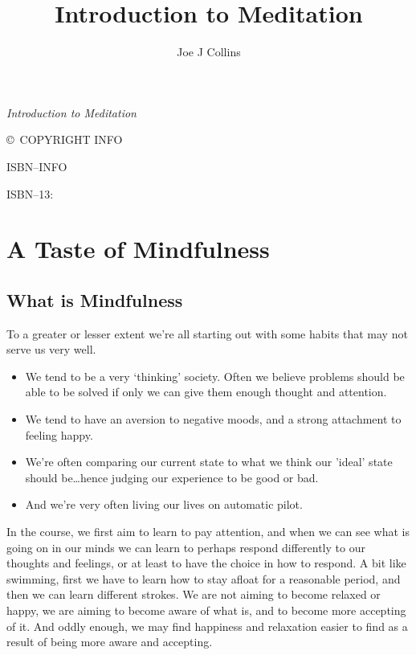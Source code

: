 \documentclass[10pt, twoside, openright, a5paper]{memoir}
\author{Joe J Collins}
\title{Introduction to Meditation}
\date{}
\makeatletter
\def\maketitle{%
  \null
  \thispagestyle{empty}%
  \vfill
  \begin{center}\leavevmode
    \normalfont
    {\LARGE\raggedleft \@author\par}%
    \hrulefill\par
    {\huge\raggedright \@title\par}%
    \vskip 1cm
  \end{center}%
  \vfill
  \null
  \cleardoublepage
  }
\makeatother
\begin{document}
\let\cleardoublepage\clearpage


\maketitle


\frontmatter

\null\vfill

\begin{flushleft}
\textit{Introduction to Meditation}

\copyright\ COPYRIGHT INFO

ISBN--INFO

ISBN--13: 
\bigskip

\end{flushleft}
\let\cleardoublepage\clearpage

\mainmatter
\sloppy

\chapter{A Taste of Mindfulness}

\section{What is Mindfulness}

To a greater or lesser extent we're all starting out with some habits that may not serve us very well.

\begin{itemize}
  \item We tend to be a very `thinking' society. Often we believe problems should be able to be solved if only we can give them enough thought and attention.
  \item We tend to have an aversion to negative moods, and a strong attachment to feeling happy.
  \item We're often comparing our current state to what we think our 'ideal' state should be\ldots hence judging our experience to be good or bad.
  \item And we're very often living our lives on automatic pilot.
\end{itemize}

In the course, we first aim to learn to pay attention, and when we can see what is going on in our minds we can learn to perhaps respond differently to our thoughts and feelings, or at least to have the choice in how to respond. A bit like swimming, first we have to learn how to stay afloat for a reasonable period, and then we can learn different strokes. We are not aiming to become relaxed or happy, we are aiming to become aware of what is, and to become more accepting of it. And oddly enough, we may find happiness and relaxation easier to find as a result of being more aware and accepting.
\end{document}
